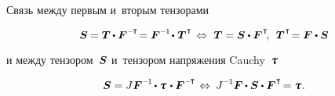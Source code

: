 \begin{otherlanguage}{russian}
Связь между первым и~вторым тензорами

\nopagebreak\vspace{-0.12em}\begin{equation*}
\secondpiolakirchhoffstress \hspace{-0.1ex}
= \firstpiolakirchhoffstress \hspace{-0.1ex} \dotp \bm{F}^{\hspace{.1ex}\expminusT} \hspace{-0.4ex}
= \bm{F}^{\hspace{.1ex}\expminusone} \hspace{-0.3ex} \dotp \hspace{.1ex} \firstpiolakirchhoffstress^{\hspace{.1ex}\T}
%
\hspace{.25ex} \Leftrightarrow \hspace{.75ex}
%
\firstpiolakirchhoffstress = \secondpiolakirchhoffstress \dotp \bm{F}^{\hspace{.1ex}\T}
\hspace{-0.4ex} , \:\:
\firstpiolakirchhoffstress^{\hspace{.1ex}\T} \hspace{-0.4ex} = \bm{F} \dotp \secondpiolakirchhoffstress
\end{equation*}

\vspace{-0.2em}\noindent
и между тензором~$\bm{S}$ и~тензором напряжения Cauchy~$\cauchystress$

\nopagebreak\vspace{-0.12em}\begin{equation*}
\secondpiolakirchhoffstress = J \bm{F}^{\hspace{.1ex}\expminusone} \hspace{-0.2ex} \dotp \cauchystress \hspace{.16ex} \dotp \bm{F}^{\hspace{.1ex}\expminusT}
\hspace{.2ex} \Leftrightarrow \hspace{.5ex}
J^{\hspace{.12ex}\expminusone} \bm{F} \hspace{-0.1ex} \dotp \secondpiolakirchhoffstress \dotp \bm{F}^{\hspace{.1ex}\T} \hspace{-0.32ex}
= \cauchystress \hspace{.1ex}.
\end{equation*}


\end{otherlanguage}
